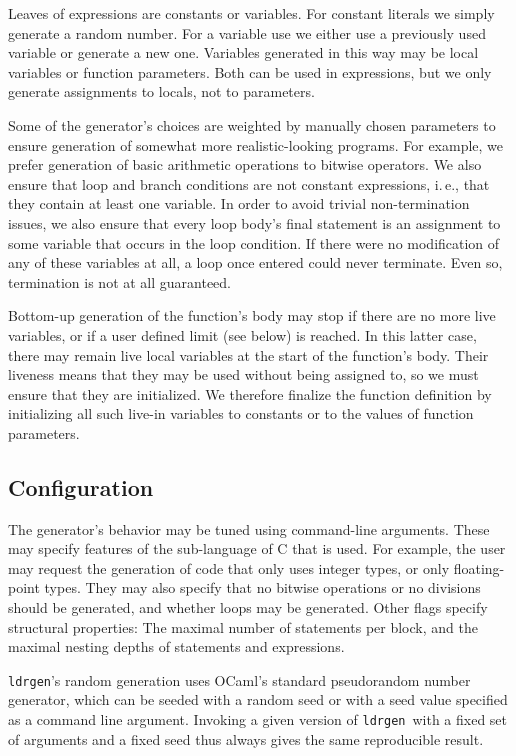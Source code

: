 \documentclass{llncs}
\newcommand\ldrgen{\texttt{ldrgen}}
\begin{document}
Leaves of expressions are constants or variables. For constant literals we
simply generate a random number. For a variable use we either use a
previously used variable or generate a new one. Variables generated in
this way may be local variables or function parameters. Both can be used in
expressions, but we only generate assignments to locals, not to parameters.

Some of the generator's choices are weighted by manually chosen parameters
to ensure generation of somewhat more realistic-looking programs. For
example, we prefer generation of basic arithmetic operations to bitwise
operators. We also ensure that loop and branch conditions are not constant
expressions, i.\,e., that they contain at least one variable. In order to
avoid trivial non-termination issues, we also ensure that every loop body's
final statement is an assignment to some variable that occurs in the loop
condition. If there were no modification of any of these variables at all, a
loop once entered could never terminate. Even so, termination is not at all
guaranteed.

Bottom-up generation of the function's body may stop if there are no more
live variables, or if a user defined limit (see below) is reached. In this
latter case, there may remain live local variables at the start of the
function's body. Their liveness means that they may be used without being
assigned to, so we must ensure that they are initialized. We therefore
finalize the function definition by initializing all such live-in variables
to constants or to the values of function parameters.

\subsection{Configuration}

The generator's behavior may be tuned using command-line arguments. These
may specify features of the sub-language of C that is used. For example, the
user may request the generation of code that only uses integer types, or
only floating-point types. They may also specify that no bitwise operations
or no divisions should be generated, and whether loops may be generated.
Other flags specify structural properties: The maximal number of statements
per block, and the maximal nesting depths of statements and expressions.

\ldrgen's random generation uses OCaml's standard pseudorandom number
generator, which can be seeded with a random seed or with a seed value
specified as a command line argument. Invoking a given version of \ldrgen\
with a fixed set of arguments and a fixed seed thus always gives the same
reproducible result.
\end{document}

